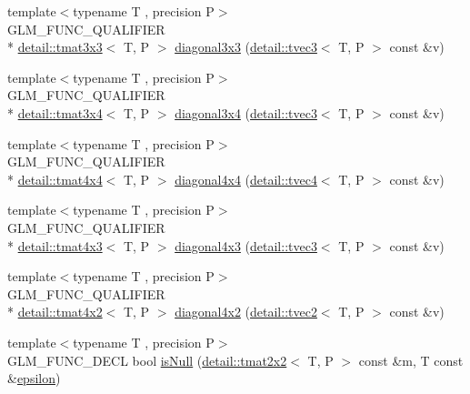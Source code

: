 \begin{DoxyCompactItemize}
\item 
{\footnotesize template$<$typename T , precision P$>$ }\\G\-L\-M\-\_\-\-F\-U\-N\-C\-\_\-\-Q\-U\-A\-L\-I\-F\-I\-E\-R \\*
\hyperlink{structglm_1_1detail_1_1tmat3x3}{detail\-::tmat3x3}$<$ T, P $>$ \hyperlink{group__gtx__matrix__operation_gaa49be0f424ad2f3015c5945c13a5fad0}{diagonal3x3} (\hyperlink{structglm_1_1detail_1_1tvec3}{detail\-::tvec3}$<$ T, P $>$ const \&v)
\item 
{\footnotesize template$<$typename T , precision P$>$ }\\G\-L\-M\-\_\-\-F\-U\-N\-C\-\_\-\-Q\-U\-A\-L\-I\-F\-I\-E\-R \\*
\hyperlink{structglm_1_1detail_1_1tmat3x4}{detail\-::tmat3x4}$<$ T, P $>$ \hyperlink{group__gtx__matrix__operation_gab96c533557a191bd972300868f8111ef}{diagonal3x4} (\hyperlink{structglm_1_1detail_1_1tvec3}{detail\-::tvec3}$<$ T, P $>$ const \&v)
\item 
{\footnotesize template$<$typename T , precision P$>$ }\\G\-L\-M\-\_\-\-F\-U\-N\-C\-\_\-\-Q\-U\-A\-L\-I\-F\-I\-E\-R \\*
\hyperlink{structglm_1_1detail_1_1tmat4x4}{detail\-::tmat4x4}$<$ T, P $>$ \hyperlink{group__gtx__matrix__operation_ga0c286e9aa92074f12663617cfedfa72c}{diagonal4x4} (\hyperlink{structglm_1_1detail_1_1tvec4}{detail\-::tvec4}$<$ T, P $>$ const \&v)
\item 
{\footnotesize template$<$typename T , precision P$>$ }\\G\-L\-M\-\_\-\-F\-U\-N\-C\-\_\-\-Q\-U\-A\-L\-I\-F\-I\-E\-R \\*
\hyperlink{structglm_1_1detail_1_1tmat4x3}{detail\-::tmat4x3}$<$ T, P $>$ \hyperlink{group__gtx__matrix__operation_gaff804ead2f02ac48c8daf0d44a81d224}{diagonal4x3} (\hyperlink{structglm_1_1detail_1_1tvec3}{detail\-::tvec3}$<$ T, P $>$ const \&v)
\item 
{\footnotesize template$<$typename T , precision P$>$ }\\G\-L\-M\-\_\-\-F\-U\-N\-C\-\_\-\-Q\-U\-A\-L\-I\-F\-I\-E\-R \\*
\hyperlink{structglm_1_1detail_1_1tmat4x2}{detail\-::tmat4x2}$<$ T, P $>$ \hyperlink{group__gtx__matrix__operation_ga1ec0fc953d871fc9894bcfcc81dbaf68}{diagonal4x2} (\hyperlink{structglm_1_1detail_1_1tvec2}{detail\-::tvec2}$<$ T, P $>$ const \&v)
\item 
{\footnotesize template$<$typename T , precision P$>$ }\\G\-L\-M\-\_\-\-F\-U\-N\-C\-\_\-\-D\-E\-C\-L bool \hyperlink{group__gtx__matrix__query_gaf7e38680b67a3589a262d281660e4694}{is\-Null} (\hyperlink{structglm_1_1detail_1_1tmat2x2}{detail\-::tmat2x2}$<$ T, P $>$ const \&m, T const \&\hyperlink{group__gtc__constants_gacb41049b8d22c8aa90e362b96c524feb}{epsilon})

\end{DoxyCompactItemize}

